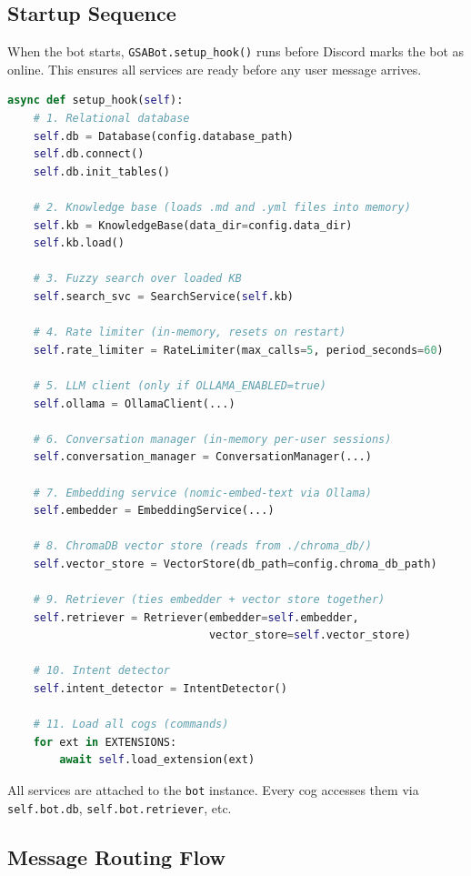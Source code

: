 \documentclass[12pt,letterpaper]{article}
\begin{document}
\subsection{Startup Sequence}

When the bot starts, \texttt{GSABot.setup\_hook()} runs before Discord marks the
bot as online. This ensures all services are ready before any user message
arrives.

\begin{lstlisting}[language=Python, caption={Startup sequence (simplified from main.py)}]
async def setup_hook(self):
    # 1. Relational database
    self.db = Database(config.database_path)
    self.db.connect()
    self.db.init_tables()

    # 2. Knowledge base (loads .md and .yml files into memory)
    self.kb = KnowledgeBase(data_dir=config.data_dir)
    self.kb.load()

    # 3. Fuzzy search over loaded KB
    self.search_svc = SearchService(self.kb)

    # 4. Rate limiter (in-memory, resets on restart)
    self.rate_limiter = RateLimiter(max_calls=5, period_seconds=60)

    # 5. LLM client (only if OLLAMA_ENABLED=true)
    self.ollama = OllamaClient(...)

    # 6. Conversation manager (in-memory per-user sessions)
    self.conversation_manager = ConversationManager(...)

    # 7. Embedding service (nomic-embed-text via Ollama)
    self.embedder = EmbeddingService(...)

    # 8. ChromaDB vector store (reads from ./chroma_db/)
    self.vector_store = VectorStore(db_path=config.chroma_db_path)

    # 9. Retriever (ties embedder + vector store together)
    self.retriever = Retriever(embedder=self.embedder,
                               vector_store=self.vector_store)

    # 10. Intent detector
    self.intent_detector = IntentDetector()

    # 11. Load all cogs (commands)
    for ext in EXTENSIONS:
        await self.load_extension(ext)
\end{lstlisting}

All services are attached to the \texttt{bot} instance. Every cog accesses them
via \texttt{self.bot.db}, \texttt{self.bot.retriever}, etc.

\subsection{Message Routing Flow}
\end{document}
